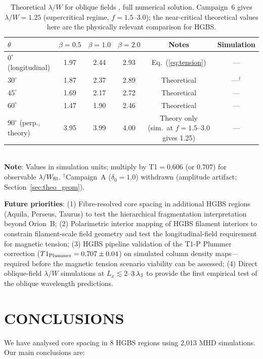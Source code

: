 \documentclass[twoside,twocolumn]{mnras}
\begin{document}
\begin{table}
\caption{Theoretical $\lambda/W$ for oblique fields \citep{Nakamura1993}, full numerical
solution. Campaign~6 gives $\lambda/W=1.25$ (supercritical regime, $f=1.5$--$3.0$); the
near-critical theoretical values here are the physically relevant comparison for HGBS.}
\label{tab:oblique_theory}
\small
\begin{tabular}{lccccc}
\toprule
$\theta$ & $\beta=0.5$ & $\beta=1.0$ & $\beta=2.0$ & Notes & Simulation \\
\midrule
$0^\circ$ (longitudinal) & 1.97 & 2.44 & 2.93 & Eq.~(\ref{eq:tension}) & --- \\
$30^\circ$ & 1.87 & 2.37 & 2.89 & Theoretical & ---$^\dagger$ \\
$45^\circ$ & 1.69 & 2.17 & 2.72 & Theoretical & --- \\
$60^\circ$ & 1.47 & 1.90 & 2.46 & Theoretical & --- \\
$90^\circ$ (perp., theory) & 3.95 & 3.99 & 4.00 & Theory only (sim.\ at $f=1.5$--$3.0$ gives 1.25) & --- \\
\bottomrule
\end{tabular}
\\ \footnotesize \textbf{Note}: Values in simulation units; multiply by T1$=0.606$ (or $0.707$) for observable $\lambda/W_{\rm fil}$. $^\dagger$Campaign~A ($\delta_0=1.0$) withdrawn (amplitude artifact; Section~\ref{sec:theo_geom}).
\end{table}

\textbf{Future priorities}:
(1) Fibre-resolved core spacing in additional HGBS regions (Aquila, Perseus, Taurus) to
    test the hierarchical fragmentation interpretation beyond Orion~B;
(2) Polarimetric interior mapping of HGBS filament interiors to constrain filament-scale
    field geometry and test the longitudinal-field requirement for magnetic tension;
(3) HGBS pipeline validation of the T1-P Plummer correction ($T1_{\rm Plummer} = 0.707
    \pm 0.04$) on simulated column density maps---required before the magnetic tension
    scenario viability can be assessed;
(4) Direct oblique-field $\lambda/W$ simulations at $L_x \lesssim 2$--$3\,\lambda_{\rm J}$
    to provide the first empirical test of the \citet{Nakamura1993} oblique wavelength
    predictions.

\section{CONCLUSIONS}

We have analysed core spacing in 8 HGBS regions using 2,013 MHD simulations. Our main conclusions are:
\end{document}

